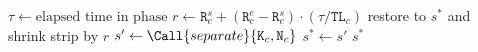 \begin{algorithm}[htbp]
    \caption{\texttt{compress}($s^*$)}
    \begin{algorithmic}[1]
            \State $\tau \gets \text{elapsed time in phase}$
            \State $r \gets \texttt{R}_{c}^s + (\texttt{R}_{c}^e - \texttt{R}_{c}^s) \cdot (\tau / \texttt{TL}_c)$ 
            \State restore to $s^*$ and shrink strip by $r$
            \State $s' \gets \Call{separate}{\texttt{K}_c,\texttt{N}_c}$ 
                \State $s^* \gets s'$
            \EndIf
        \EndWhile
        \State \Return $s^*$
    \end{algorithmic}
    \label{alg:compress}
\end{algorithm}